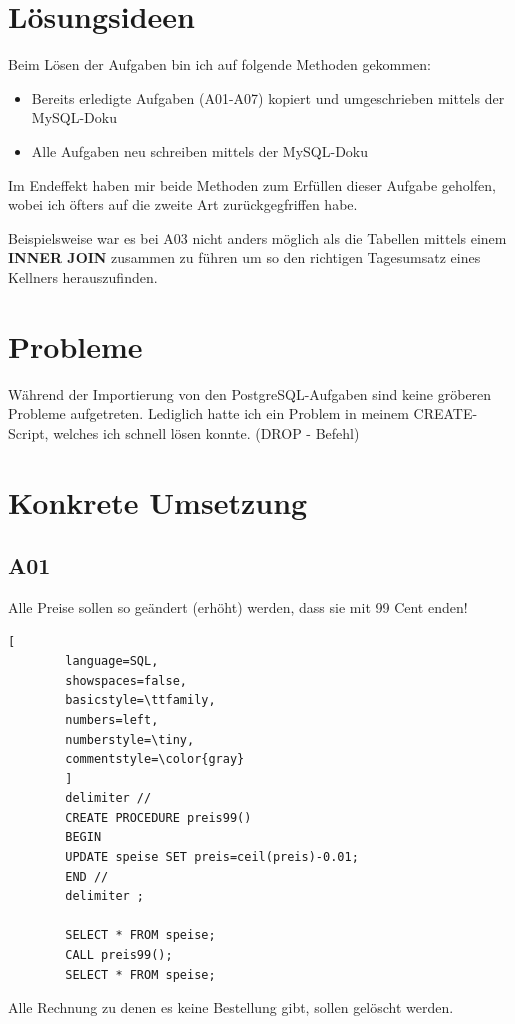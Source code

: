 
\section{Lösungsideen}
Beim Lösen der Aufgaben bin ich auf folgende Methoden gekommen:

\begin{itemize}
	\item Bereits erledigte Aufgaben (A01-A07) kopiert und umgeschrieben mittels der MySQL-Doku
	\item Alle Aufgaben neu schreiben mittels der MySQL-Doku
\end{itemize}

	Im Endeffekt haben mir beide Methoden zum Erfüllen dieser Aufgabe geholfen, wobei ich öfters auf die zweite Art
	zurückgegfriffen habe.
	
	Beispielsweise war es bei A03 nicht anders möglich als die Tabellen mittels einem \textbf{INNER JOIN} zusammen zu führen um so den richtigen Tagesumsatz eines Kellners herauszufinden.
\section{Probleme}
	Während der Importierung von den PostgreSQL-Aufgaben sind keine gröberen Probleme aufgetreten. Lediglich hatte ich ein Problem in meinem CREATE-Script, welches ich schnell lösen konnte. (DROP - Befehl)
\section{Konkrete Umsetzung}
	\subsection{A01}
		Alle Preise sollen so geändert (erhöht) werden, dass sie mit 99 Cent enden!
		\begin{lstlisting}[
		language=SQL,
		showspaces=false,
		basicstyle=\ttfamily,
		numbers=left,
		numberstyle=\tiny,
		commentstyle=\color{gray}
		]
		delimiter //
		CREATE PROCEDURE preis99() 
		BEGIN
		UPDATE speise SET preis=ceil(preis)-0.01;
		END //
		delimiter ;
		
		SELECT * FROM speise;
		CALL preis99();
		SELECT * FROM speise;
		\end{lstlisting}
		
		\clearpage
		
		Alle Rechnung zu denen es keine Bestellung gibt, sollen gelöscht werden.
		
